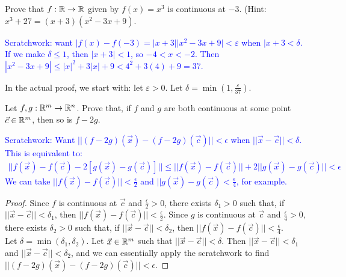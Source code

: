 \begin{example}
Prove that $f : \mathbb{R} \to \mathbb{R}$ given by $f(x) = x^3$ is continuous at $-3$. (Hint: $x^3 + 27 = (x+3)(x^2 - 3x+9)$.
\end{example}

\textcolor{blue}{
Scratchwork:
want $|f(x) - f(-3) = |x+3||x^2 - 3x+9| < \varepsilon$ when $|x+3 < \delta$. If we make $\delta \le 1$, then $|x+3| < 1$, so $-4 < x < -2$. Then $|x^2 - 3x + 9| \le |x|^2 + 3|x| + 9 < 4^2 + 3(4) + 9 = 37$.\\
}

In the actual proof, we start with: let $\varepsilon > 0$. Let $\delta = \min\left(1, \frac \varepsilon {37}\right)$.

\begin{example}
Let $f, g: \mathbb{R}^m \to \mathbb{R}^n$. Prove that, if $f$ and $g$ are both continuous at some point $\vec c \in \mathbb{R}^m$, then so is $f - 2g$.
\end{example}

\textcolor{blue}{
Scratchwork: Want $||(f-2g) (\vec x) - (f - 2g) ( \vec c)|| < \epsilon$ when $||\vec x - \vec c|| < \delta$. This is equivalent to:
\begin{align*}
    ||f(\vec x) - f(\vec c) - 2[g(\vec x) - g(\vec c)]|| \le ||f(\vec x) - f(\vec c)|| + 2||g(\vec x) - g(\vec c)|| < \epsilon
\end{align*}
We can take $||f(\vec x) - f(\vec c)|| < \frac \epsilon 2$ and $||g(\vec x) - g(\vec c) < \frac \epsilon 4$, for example.
}


\begin{proof}
Since $f$ is continuous at $\vec c$ and $\frac \epsilon 2 > 0$, there exists $\delta_1 > 0$ such that, if $||\vec x - \vec c|| < \delta_1$, then $||f(\vec x) - f(\vec c)|| < \frac \epsilon 2$. Since $g$ is continuous at $\vec c$ and $\frac \epsilon 4 > 0$, there exists $\delta_2 > 0$ such that, if $||\vec x - \vec c|| < \delta_2$, then $||f(\vec x) - f(\vec c)|| < \frac \epsilon 4$. \\

Let $\delta = \min(\delta_1, \delta_2)$. Let $\vec x \in \mathbb{R}^m$ such that $|| \vec x - \vec c|| < \delta$. Then $||\vec x - \vec c|| < \delta_1$ and $||\vec x - \vec c || < \delta_2$, and we can essentially apply the scratchwork to find $||(f-2g) (\vec x) - (f - 2g) ( \vec c)|| < \epsilon$. 
\end{proof}